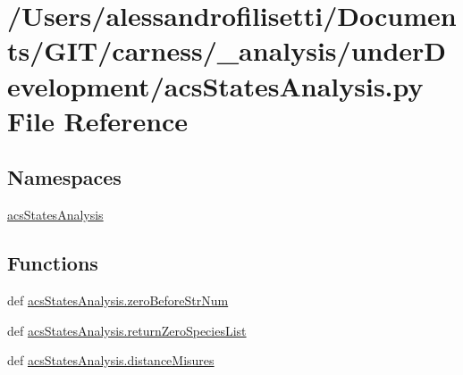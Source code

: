 \hypertarget{a00047}{\section{/\-Users/alessandrofilisetti/\-Documents/\-G\-I\-T/carness/\-\_\-analysis/under\-Development/acs\-States\-Analysis.py File Reference}
\label{a00047}
}
\subsection*{Namespaces}
\begin{DoxyCompactItemize}
\item 
\hyperlink{a00104}{acs\-States\-Analysis}
\end{DoxyCompactItemize}
\subsection*{Functions}
\begin{DoxyCompactItemize}
\item 
def \hyperlink{a00104_aeeb6d629132a9755b45a3008d445419c}{acs\-States\-Analysis.\-zero\-Before\-Str\-Num}
\item 
def \hyperlink{a00104_ad7c75c1e146fa51da42274cf7d5747d0}{acs\-States\-Analysis.\-return\-Zero\-Species\-List}
\item 
def \hyperlink{a00104_a76768d52780b1415a920dc94b3c991c0}{acs\-States\-Analysis.\-distance\-Misures}
\end{DoxyCompactItemize}
